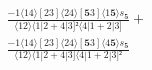 \documentclass[varwidth, border=5pt]{standalone}
\begin{document}
\begin{my}
$\begin{gathered}
\scriptscriptstyle\frac{-1⟨14⟩[23]⟨24⟩[𝟓3]⟨1𝟓⟩s_{𝟓}}{⟨12⟩⟨1|2+4|3]²⟨4|1+2|3]} +\\
\scriptscriptstyle\frac{-1⟨14⟩[23]⟨24⟩[𝟓3]⟨4𝟓⟩s_{𝟓}}{⟨12⟩⟨1|2+4|3]⟨4|1+2|3]²} \phantom{+}
\end{gathered}$
\end{my}
\end{document}
